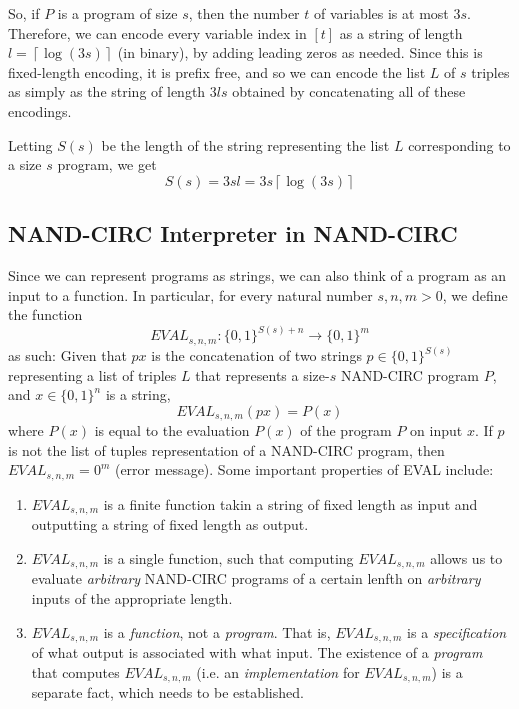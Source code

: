 \documentclass[a4paper, 12pt]{report}
\theoremstyle{remark}
\theoremstyle{definition}
\begin{document}
So, if $P$ is a program of size $s$, then the number $t$ of variables is at most $3s$. Therefore, we can encode every variable index in $[t]$ as a string of length $l = \left\lceil{\log(3s)}\right\rceil$ (in binary), by adding leading zeros as needed. Since this is fixed-length encoding, it is prefix free, and so we can encode the list $L$ of $s$ triples as simply as the string of length $3ls$ obtained by concatenating all of these encodings. 

Letting $S(s)$ be the length of the string representing the list $L$ corresponding to a size $s$ program, we get
\[S(s) = 3sl = 3s \left\lceil{\log(3s)}\right\rceil\]

\subsection{NAND-CIRC Interpreter in NAND-CIRC}
Since we can represent programs as strings, we can also think of a program as an input to a function. In particular, for every natural number $s, n, m > 0$, we define the function
\[EVAL_{s, n, m} : \{0,1\}^{S(s) + n} \longrightarrow \{0,1\}^m\]
as such: Given that $px$ is the concatenation of two strings $p \in \{0,1\}^{S(s)}$ representing a list of triples $L$ that represents a size-$s$ NAND-CIRC program $P$, and $x \in \{0,1\}^n$ is a string, 
\[EVAL_{s, n, m} (px) = P(x)\]
where $P(x)$ is equal to the evaluation $P(x)$ of the program $P$ on input $x$. If $p$ is not the list of tuples representation of a NAND-CIRC program, then $EVAL_{s, n, m} = 0^m$ (error message). Some important properties of EVAL include: 
\begin{enumerate}
    \item $EVAL_{s, n, m}$ is a finite function takin a string of fixed length as input and outputting a string of fixed length as output. 
    \item $EVAL_{s, n, m}$ is a single function, such that computing $EVAL_{s, n, m}$ allows us to evaluate \textit{arbitrary} NAND-CIRC programs of a certain lenfth on \textit{arbitrary} inputs of the appropriate length. 
    \item $EVAL_{s, n, m}$ is a \textit{function}, not a \textit{program}. That is, $EVAL_{s, n, m}$ is a \textit{specification} of what output is associated with what input. The existence of a \textit{program} that computes $EVAL_{s, n, m}$ (i.e. an \textit{implementation} for $EVAL_{s, n, m}$) is a separate fact, which needs to be established. 
\end{enumerate}
\end{document}
